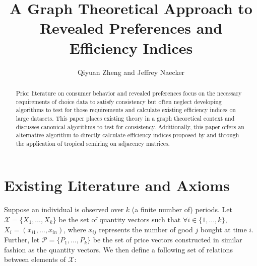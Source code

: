 \documentclass{article} %
\title{A Graph Theoretical Approach to Revealed Preferences and Efficiency Indices}
\author{Qiyuan Zheng and Jeffrey Naecker}
\theoremstyle{style1}
\theoremstyle{style1}
\theoremstyle{example}
\begin{document}
\maketitle

\begin{abstract}
Prior literature on consumer behavior and revealed preferences focus on the necessary requirements of choice data to satisfy consistency but often neglect developing algorithms to test for those requirements and calculate existing efficiency indices on large datasets. This paper places existing theory in a graph theoretical context and discusses canonical algorithms to test for consistency. Additionally, this paper offers an alternative algorithm to directly calculate efficiency indices proposed by \citet{Afriat1967The-Construction-of-Utility-Functions-from-Expenditure-Data} and \citet{Varian1990Goodness-of-fit-in-optimizing-models} through the application of tropical semiring on adjacency matrices.
\end{abstract}

\section{Existing Literature and Axioms}


Suppose an individual is observed over $k$ (a finite number of) periods. Let $\mathcal{X}=\{X_1,\ldots,X_k\}$ be the set of quantity vectors such that $\forall i\in\{1,\ldots,k\}$, $X_i=(x_{i1},\ldots,x_{in})$, where $x_{ij}$ represents the number of good $j$ bought at time $i$. Further, let $\mathcal{P}=\{P_1,\ldots,P_k\}$ be the set of price vectors constructed in similar fashion as the quantity vectors. We then define a following set of relations between elements of $\mathcal{X}$:
\end{document}
